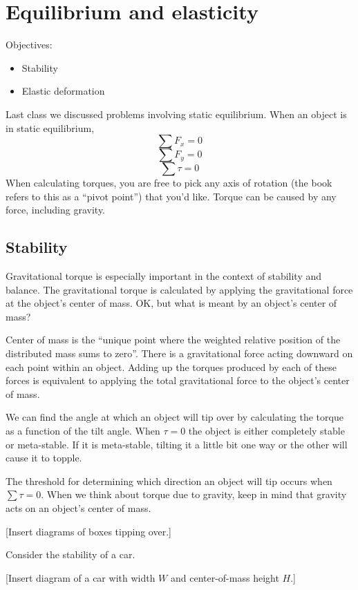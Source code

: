 \section{Equilibrium and elasticity}
Objectives:
\begin{itemize}
\item Stability
\item Elastic deformation
\end{itemize}

Last class we discussed problems involving static equilibrium. When an object is in static equilibrium,
$$\sum F_x=0$$
$$\sum F_y=0$$
$$\sum \tau=0$$
When calculating torques, you are free to pick any axis of rotation (the book refers to this as a ``pivot point'') that you'd like. Torque can be caused by any force, including gravity. 

\subsection{Stability}
Gravitational torque is especially important in the context of stability and balance. The gravitational torque is calculated by applying the gravitational force at the object's center of mass. OK, but what is meant by an object's center of mass?

Center of mass is the ``unique point where the weighted relative position of the distributed mass sums to zero''. There is a gravitational force acting downward on each point within an object. Adding up the torques produced by each of these forces is equivalent to applying the total gravitational force to the object's center of mass.

We can find the angle at which an object will tip over by calculating the torque as a function of the tilt angle. When $\tau=0$ the object is either completely stable or meta-stable. If it is meta-stable, tilting it a little bit one way or the other will cause it to topple.

The threshold for determining which direction an object will tip occurs when $\sum \tau =0$. When we think about torque due to gravity, keep in mind that gravity acts on an object's center of mass. 

[Insert diagrams of boxes tipping over.]
\vspace{5cm}

\clearpage
Consider the stability of a car.

[Insert diagram of a car with width $W$ and center-of-mass height $H$.]
\vspace{5cm}

